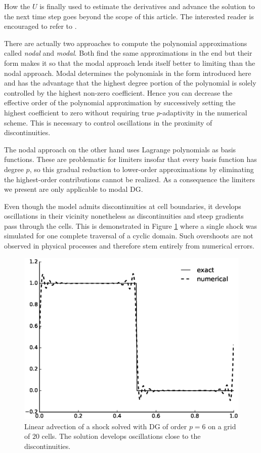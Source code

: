 How the  $U$ is finally used to estimate the derivatives and advance the solution to the next time step goes beyond the scope of this article.
The interested reader is encouraged to refer to \cite[Chapter 3]{Hesthaven2007}.

There are actually two approaches to compute the polynomial approximations called \emph{nodal} and \emph{modal}.
Both find the same approximations in the end but their form makes it so that the modal approach lends itself better to limiting than the nodal approach.
Modal determines the polynomials in the form introduced here and has the advantage that the highest degree portion of the polynomial is solely controlled by the highest non-zero coefficient.
Hence you can decrease the effective order of the polynomial approximation by successively setting the highest coefficient to zero without requiring true $p$-adaptivity in the numerical scheme.
This is necessary to control oscillations in the proximity of discontinuities.

The nodal approach on the other hand uses Lagrange polynomials as basis functions.
These are problematic for limiters insofar that every basis function has degree $p$, so this gradual reduction to lower-order approximations by eliminating the highest-order contributions cannot be realized.
As a consequence the limiters we present are only applicable to modal DG.

Even though the model admits discontinuities at cell boundaries, it develops oscillations in their vicinity nonetheless as discontinuities and steep gradients pass through the cells.
This is demonstrated in Figure \ref{fig:dg-oscillations} where a single shock was simulated for one complete traversal of a cyclic domain.
Such overshoots are not observed in physical processes and therefore stem entirely from numerical errors.

\begin{figure}[h]
  \centering
  \includegraphics[width=0.8\columnwidth]{figures/oscillations}
  \caption{Linear advection of a shock solved with DG of order $p = 6$ on a grid of $20$ cells. The solution develops oscillations close to the discontinuities.}
  \label{fig:dg-oscillations}
\end{figure}

